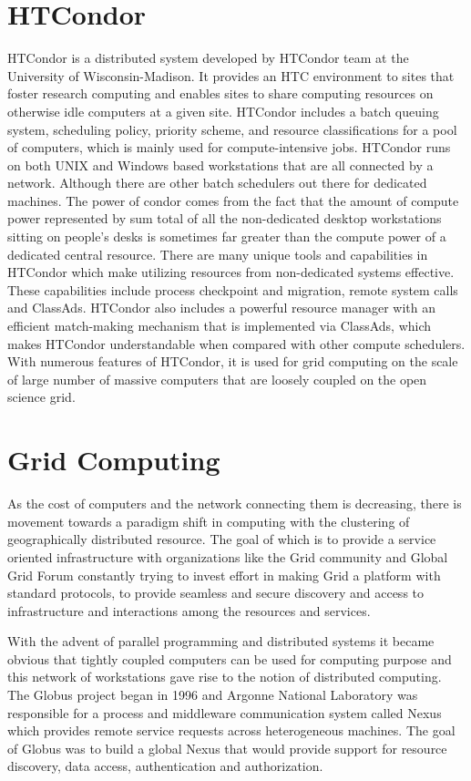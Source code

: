 \documentclass[ms,electronic,double]{nuthesis}
\begin{document}
\section{HTCondor} HTCondor is a distributed system developed by HTCondor team at the 
University of Wisconsin-Madison. It provides an HTC environment to sites 
that foster research computing and enables sites to share computing resources on otherwise  
idle computers at a given site. HTCondor includes a batch queuing 
system, scheduling policy, priority scheme, and resource classifications for a pool of 
computers, which is mainly used for compute-intensive jobs. HTCondor runs on both
 UNIX and Windows based workstations that are all connected by a network.  
Although there are other batch schedulers out there for dedicated machines. 
The power of condor comes from  the fact that  the amount of compute power 
represented by sum total of all the 
 non-dedicated desktop workstations sitting on people's desks is sometimes far 
 greater than the compute power of a dedicated central resource. There are many 
 unique tools and capabilities in HTCondor which make utilizing resources from 
 non-dedicated systems effective. These capabilities include process checkpoint 
 and migration, remote system calls and ClassAds. HTCondor also includes a 
 powerful resource manager with an efficient match-making mechanism that is 
 implemented via ClassAds, which makes HTCondor understandable when compared with other 
 compute schedulers\cite{manual56}. With numerous features of HTCondor, it is 
 used for grid computing on the scale of large number of massive computers 
 that are loosely coupled on the open science grid.
 
 
\section{Grid Computing}

As the cost of computers and the network connecting them is decreasing, there is movement towards a 
paradigm shift in computing with the clustering of geographically distributed 
resource. The goal of which is to provide a 
service oriented infrastructure  with organizations like the Grid community and Global Grid Forum 
constantly trying to invest effort in making Grid a platform with standard 
protocols, to provide seamless and secure discovery and access to infrastructure and interactions among
 the resources and services.
 
 With the advent of parallel programming and distributed systems it became 
 obvious that tightly coupled computers can be used for computing purpose and this 
 network of workstations  gave rise to the notion of distributed computing. 
 The Globus project began in 1996 and Argonne National Laboratory was responsible for a process 
 and middleware communication system called Nexus which provides remote service 
 requests across heterogeneous machines. The goal of Globus was to build a 
 global Nexus that would provide support for resource discovery, data access, 
 authentication and authorization.
\end{document}
